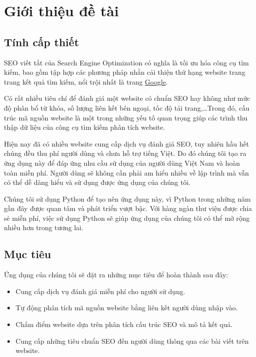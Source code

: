 \chapter{Giới thiệu đề tài}
\section{Tính cấp thiết}
SEO viết tắt của Search Engine Optimization có nghĩa là tối ưu hóa công cụ tìm kiếm, bao gồm tập hợp các phương pháp nhằn cải thiện thứ hạng website trang trang kết quả tìm kiếm, nổi trội nhất là trang \href{https://www.google.com}{Google}.
\par
Có rất nhiều tiêu chí để đánh giá một website có chuẩn SEO hay không như mức độ phân bổ từ khóa, số lượng liên kết bên ngoại, tốc độ tải trang,\ldots Trong đó, cấu trúc mã nguồn website là một trong những yếu tố quan trọng giúp các trình thu thập dữ liệu của công cụ tìm kiếm phân tích website.
\par
Hiện nay đã có nhiều website cung cấp dịch vụ đánh giá SEO, tuy nhiên hầu hết chúng đều thu phí người dùng và chưa hỗ trợ tiếng Việt. Do đó chúng tôi tạo ra ứng dụng này để đáp ứng nhu cầu sử dụng của người dùng Việt Nam và hoàn toàn miễn phí. Người dùng sẽ không cần phải am hiểu nhiều về lập trình mà vẫn có thể dễ dàng hiểu và sử dụng được ứng dụng của chúng tôi.
\par
Chúng tôi sử dụng Python để tạo nên ứng dụng này, vì Python trong những năm gần đây được quan tâm và phát triển vượt bậc. Với hàng ngàn thư viện được chia sẻ miễn phí, việc sử dụng Python sẽ giúp ứng dụng của chúng tôi có thể mở rộng nhiều hơn trong tương lai.
\section{Mục tiêu}
Ứng dụng của chúng tôi sẽ đặt ra những mục tiêu để hoàn thành sau đây:
\begin{itemize}
	\item Cung cấp dịch vụ đánh giá miễn phí cho người sử dụng.
	\item Tự động phân tích mã nguồn website bằng liên kết người dùng nhập vào.
	\item Chấm điểm website dựa trên phân tích cấu trúc SEO và mô tả kết quả.
	\item Cung cấp những tiêu chuẩn SEO đến người dùng thông qua các bài viết trên website.
\end{itemize}
